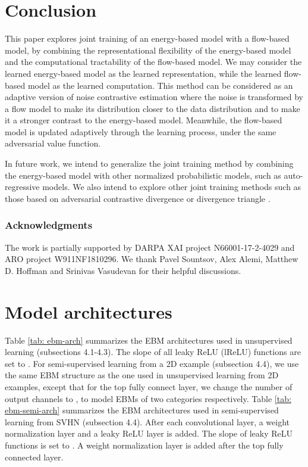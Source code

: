 \documentclass[10pt,twocolumn,letterpaper]{article}
\begin{document}
\section{Conclusion}
This paper explores joint training of an energy-based model with a flow-based model, by combining the representational flexibility of the energy-based model and the computational tractability of the flow-based model.
We may consider the learned energy-based model as the learned representation, while the learned flow-based model as the learned computation.
This method can be considered as an adaptive version of noise contrastive estimation where the noise is transformed by a flow model to make its distribution closer to the data distribution and to make it a stronger contrast to the energy-based model. Meanwhile, the flow-based model is updated adaptively through the learning process, under the same adversarial value function. 

In future work, we intend to generalize the joint training method by combining the energy-based model with other normalized probabilistic models, such as auto-regressive models. We also intend to explore other joint training methods such as those based on adversarial contrastive divergence \cite{kim2016deep, dai2017calibrating, han2018divergence}  or divergence triangle \cite{han2018divergence}.

\subsubsection*{Acknowledgments}


The work is partially supported by DARPA XAI project N66001-17-2-4029 and ARO project W911NF1810296. We thank Pavel Sountsov, Alex Alemi, Matthew D. Hoffman and Srinivas Vasudevan for their helpful discussions. 

{\small


}
\newpage
\appendix
\section{Model architectures}	
Table \ref{tab: ebm-arch} summarizes the EBM architectures used in unsupervised learning (subsections 4.1-4.3). The slope of all leaky ReLU (lReLU) \cite{maas2013rectifier} functions are set to . For semi-supervised learning from a 2D example (subsection 4.4), we use the same EBM structure as the one used in unsupervised learning from 2D examples, except that for the top fully connect layer, we change the number of output channels to , to model EBMs of two categories respectively. Table \ref{tab: ebm-semi-arch} summarizes the EBM architectures used in semi-supervised learning from SVHN (subsection 4.4).  After each convolutional layer, a weight normalization \cite{salimans2016weight} layer and a leaky ReLU layer is added. The slope of leaky ReLU functions is set to . A weight normalization layer is added after the top fully connected layer. 
\end{document}
